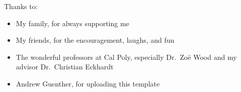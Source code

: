 \noindent
Thanks to:
\begin{itemize}
    \item My family, for always supporting me
    \item My friends, for the encouragement, laughs, and fun
    \item The wonderful professors at Cal Poly, especially Dr.~Zo\"e Wood and my advisor Dr.~Christian Eckhardt
    \item Andrew Guenther, for uploading this template
\end{itemize}
